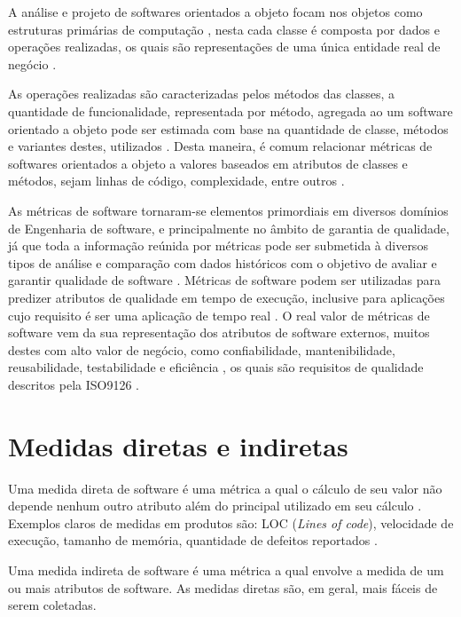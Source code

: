 \documentclass[
	12pt,				%
	oneside,			%
	a4paper,			%
	english,			%
	brazil				%
	]{abntex2ppgsi}
\begin{document}
A análise e projeto de softwares orientados a objeto focam nos objetos como estruturas primárias de computação \cite{kan95} \cite{srivastava2013}, nesta cada classe é composta por dados e operações realizadas, os quais  são representações de uma única entidade real de negócio \cite{srivastava2013}.

As operações realizadas são caracterizadas pelos métodos das classes, a quantidade de funcionalidade, representada por método, agregada ao um software orientado a objeto pode ser estimada com base na quantidade de classe, métodos e variantes destes, utilizados \cite{kan95}. Desta maneira, é comum relacionar métricas de softwares orientados a objeto a valores baseados em atributos de classes e métodos, sejam linhas de código, complexidade, entre outros \cite{kan95}.

As métricas de software tornaram-se elementos primordiais em diversos domínios de Engenharia de software, e principalmente no âmbito de garantia de qualidade, já que toda a informação reúnida por métricas pode ser submetida à diversos tipos de análise e comparação com dados históricos com o objetivo de avaliar e garantir qualidade de software \cite{srivastava2013}. Métricas de software podem ser utilizadas para predizer atributos de qualidade em tempo de execução, inclusive para aplicações cujo requisito é ser uma aplicação de tempo real \cite{srivastava2013}. O real valor de métricas de software vem da sua representação dos atributos de software externos, muitos destes com alto valor de negócio, como confiabilidade, mantenibilidade, reusabilidade, testabilidade e eficiência \cite{srivastava2013}, os quais são requisitos de qualidade descritos pela ISO9126 \cite{Zeiss2007}.






\section{Medidas diretas e indiretas}
Uma medida direta de software é uma métrica a qual o cálculo de seu valor não depende nenhum outro atributo além do principal utilizado em seu cálculo \cite{srivastava2013}. Exemplos claros de medidas em produtos são: LOC (\textit{Lines of code}), velocidade de execução, tamanho de memória, quantidade de defeitos reportados \cite{srivastava2013}.

Uma medida indireta de software é uma métrica a qual envolve a medida de um ou mais atributos de software\cite{srivastava2013}. As medidas diretas são, em geral, mais fáceis de serem coletadas.
\end{document}
